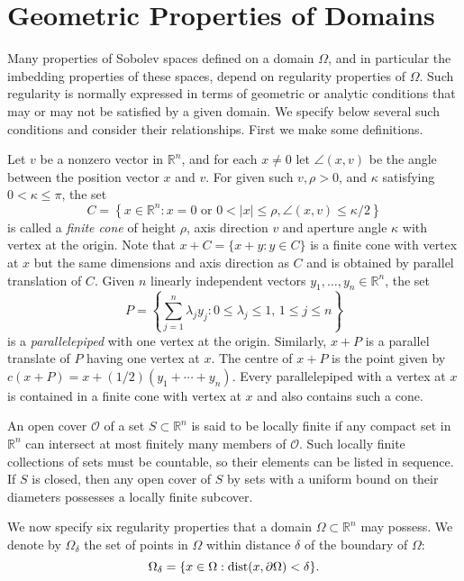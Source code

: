 \section{Geometric Properties of Domains}

\begin{para}
  Many properties of Sobolev spaces defined on a domain $\Omega$, and in particular the imbedding 
  properties of these spaces, depend on regularity properties of $\Omega$. Such regularity is 
  normally expressed in terms of geometric or analytic conditions that may or may not be 
  satisfied by a given domain. We specify below several such conditions and consider their 
  relationships. First we make some definitions.
  
  Let $v$ be a nonzero vector in $\mathbb{R}^n$, and for each $x \neq 0$ let $\angle(x, v)$ be 
  the angle between the position vector $x$ and $v$. For given such $v, \rho>0$, and $\kappa$ 
  satisfying $0<\kappa \leq \pi$, the set
  \[
    C = \left\{x \in \mathbb{R}^n: x=0 \text { or } 0<|x| \leq \rho, \angle(x, v) \leq \kappa / 2\right\}
  \]
  is called a \emph{finite cone} of height $\rho$, axis direction $v$ and aperture angle $\kappa$ 
  with vertex at the origin. Note that $x+C=\{x+y: y \in C\}$ is a finite cone with vertex at $x$ 
  but the same dimensions and axis direction as $C$ and is obtained by parallel translation of $C$.
  Given $n$ linearly independent vectors $y_1, \ldots, y_n \in \mathbb{R}^n$, the set
  \[
    P = \left\{\sum_{j=1}^n \lambda_j y_j: 0 \leq \lambda_j \leq 1,\, 1 \leq j \leq n\right\}
  \]
  is a \emph{parallelepiped} with one vertex at the origin.
  Similarly, $x+P$ is a parallel translate of $P$ having one vertex at $x$.
  The centre of $x+P$ is the point given by
  $c(x+P)=x+(1 / 2)\left(y_1+\cdots+y_n\right)$. Every parallelepiped with a vertex at $x$ is 
  contained in a finite cone with vertex at $x$ and also contains such a cone.
  
  An open cover $\mathscr{O}$ of a set $S \subset \mathbb{R}^n$ is said to be locally finite
  if any compact set in $\mathbb{R}^n$ can intersect at most finitely many members
  of $\mathscr{O}$. Such locally finite collections of sets must be countable, so their elements 
  can be listed in sequence. If $S$ is closed, then any open cover of $S$ by sets with a uniform 
  bound on their diameters possesses a locally finite subcover.
  
  We now specify six regularity properties that a domain $\Omega \subset \mathbb{R}^n$ may 
  possess. We denote by $\Omega_\delta$ the set of points in $\Omega$ within distance $\delta$ of 
  the boundary of $\Omega$:
  \[
    \Omega_\delta = \{x \in \Omega: \operatorname{dist}(x, \partial\Omega)<\delta\}.
  \]
\end{para}


